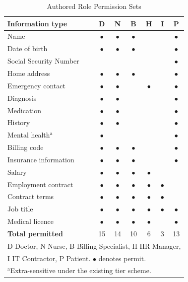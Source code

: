\documentclass[conference]{IEEEtran}
\begin{document}
\begin{table}[htbp]
\caption{Authored Role Permission Sets}
\begin{center}
\begin{tabular}{|l|c|c|c|c|c|c|}
\hline
\textbf{Information type}&\textbf{D}&\textbf{N}&\textbf{B}&\textbf{H}&\textbf{I}&\textbf{P} \\
\hline
Name & $\bullet$ & $\bullet$ & $\bullet$ & & & $\bullet$ \\
\hline
Date of birth & $\bullet$ & $\bullet$ & $\bullet$ & & & $\bullet$ \\
\hline
Social Security Number & & & & & & $\bullet$ \\
\hline
Home address & $\bullet$ & $\bullet$ & $\bullet$ & & & $\bullet$ \\
\hline
Emergency contact & $\bullet$ & $\bullet$ & & $\bullet$ & & $\bullet$ \\
\hline
Diagnosis & $\bullet$ & $\bullet$ & & & & $\bullet$ \\
\hline
Medication & $\bullet$ & $\bullet$ & & & & $\bullet$ \\
\hline
History & $\bullet$ & $\bullet$ & & & & $\bullet$ \\
\hline
Mental health$^{\mathrm{a}}$ & $\bullet$ & & & & & $\bullet$ \\
\hline
Billing code & $\bullet$ & $\bullet$ & $\bullet$ & & & $\bullet$ \\
\hline
Insurance information & $\bullet$ & $\bullet$ & $\bullet$ & & & $\bullet$ \\
\hline
Salary & $\bullet$ & $\bullet$ & $\bullet$ & $\bullet$ & & \\
\hline
Employment contract & $\bullet$ & $\bullet$ & $\bullet$ & $\bullet$ & $\bullet$ & \\
\hline
Contract terms & $\bullet$ & $\bullet$ & $\bullet$ & $\bullet$ & $\bullet$ & \\
\hline
Job title & $\bullet$ & $\bullet$ & $\bullet$ & $\bullet$ & $\bullet$ & $\bullet$ \\
\hline
Medical licence & $\bullet$ & $\bullet$ & $\bullet$ & $\bullet$ & & $\bullet$ \\
\hline
\textbf{Total permitted} & 15 & 14 & 10 & 6 & 3 & 13 \\
\hline
\multicolumn{7}{l}{D Doctor, N Nurse, B Billing Specialist, H HR Manager,} \\
\multicolumn{7}{l}{I IT Contractor, P Patient. $\bullet$ denotes permit.} \\
\multicolumn{7}{l}{$^{\mathrm{a}}$Extra-sensitive under the existing tier scheme.} \\
\end{tabular}
\label{tab:perms}
\end{center}
\end{table}
\end{document}
